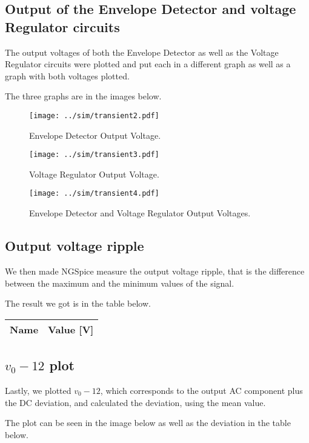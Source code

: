 \subsection{Output of the Envelope Detector and voltage Regulator circuits}
The output voltages of both the Envelope Detector as well as the Voltage Regulator circuits were plotted and put each in a different graph as well as a graph with both voltages plotted. \par
The three graphs are in the images below.

\begin{figure}[H] \centering
\texttt{[image: ../sim/transient2.pdf]}
\caption{Envelope Detector Output Voltage.}
\label{fig:transient2}
\end{figure}

\begin{figure}[H] \centering
\texttt{[image: ../sim/transient3.pdf]}
\caption{Voltage Regulator Output Voltage.}
\label{fig:transient3}
\end{figure}

\begin{figure}[H] \centering
\texttt{[image: ../sim/transient4.pdf]}
\caption{Envelope Detector and Voltage Regulator Output Voltages.}
\label{fig:transient4}
\end{figure}

\subsection{Output voltage ripple}
We then made NGSpice measure the output voltage ripple, that is the difference between the maximum and the minimum values of the signal. \par
The result we got is in the table below.

\begin{table}[H]
  \centering
  \begin{tabular}{|l|r|}
    \hline    
    {\bf Name} & {\bf Value [V]} \\ \hline
    
  \end{tabular}
  \label{tab:ripple}
\end{table}

\subsection{$v_0 - 12$ plot}
Lastly, we plotted $v_0 - 12$, which corresponds to the output AC component plus the DC deviation, and calculated the deviation, using the mean value. \par
The plot can be seen in the image below as well as the deviation in the table below. \par

